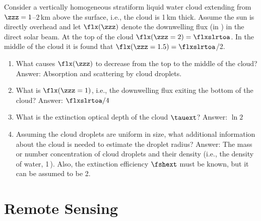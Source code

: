 \documentclass[12pt]{article}
\begin{document}
\begin{enumerate*}
\item Consider a vertically homogeneous stratiform liquid water cloud
extending from $\zzz = 1$--$2$\,km above the surface, i.e., the cloud
is 1\,km thick.
Assume the sun is directly overhead and let $\flx(\zzz)$ denote the
downwelling flux (in \wxmS) in the direct solar beam.
At the top of the cloud $\flx(\zzz = 2) = \flxslrtoa$.
In the middle of the cloud it is found that $\flx(\zzz = 1.5) =
\flxslrtoa$/2. 
\begin{enumerate}
\item What causes $\flx(\zzz)$ to decrease from the top to the middle
of the cloud?\\
\vspace{\hmwskplng}
Answer: Absorption and scattering by cloud droplets.
\vspace{\hmwskpsht}
\item What is $\flx(\zzz = 1)$, i.e., the downwelling flux exiting the 
bottom of the cloud?
Answer: $\flxslrtoa/4$
\item What is the extinction optical depth of the cloud $\tauext$?
Answer: $\ln 2$
\item Assuming the cloud droplets are uniform in size, what additional
information about the cloud is needed to estimate the droplet radius? 
Answer: The mass or number concentration of cloud droplets and their
density (i.e., the density of water, 1\,\gxcmC).
Also, the extinction efficiency $\fshext$ must be known, but it can be
assumed to be 2.
\end{enumerate}
\end{enumerate*}
\clearpage

\section[Remote Sensing]{Remote Sensing}\label{sxn:rmt_sns}

\end{document}
